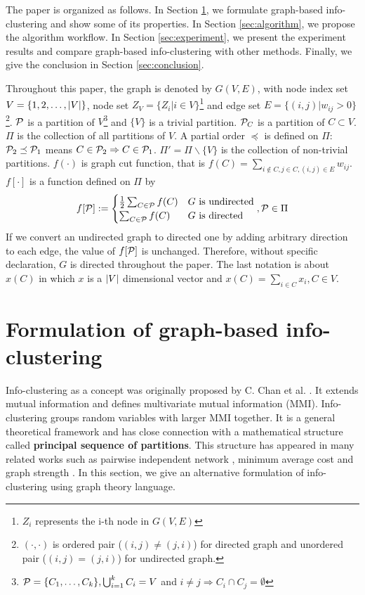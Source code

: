 \documentclass{article}
\begin{document}
The paper is organized as follows. In Section \ref{sec:models}, we formulate graph-based info-clustering and show some of its properties. In Section \ref{sec:algorithm}, we propose the algorithm workflow. In Section \ref{sec:experiment}, we present the experiment results and compare graph-based info-clustering with other methods. Finally, we give the conclusion in Section \ref{sec:conclusion}.

Throughout this paper, the graph is denoted by $G(V,E)$, with node index set $V = \{1, 2, \dots, \abs{V}\}$, node set $Z_V=\{Z_i | i \in V\}$\footnote{$Z_i$ represents the i-th node in $G(V,E)$} 
 and edge set $E=\{(i,j) | w_{ij}>0\}$\footnote{$(\cdot, \cdot)$ is ordered pair ($(i,j) \neq (j,i)$) for directed graph and unordered pair ($(i,j) = (j,i)$) for undirected graph.}. $\P$ is a partition of $V$\footnote{$\P=\{C_1, \dots, C_k\}, \bigcup_{i=1}^k C_i = V$ and $i\neq j \Rightarrow C_i \cap C_j = \emptyset$} and $\{V\}$ is a trivial partition. $\P_C$ is a partition of $C\subset V$. $\Pi$ is the collection of all partitions of $V$. A partial order $\preceq $ is defined on $\Pi$: $\P_2 \preceq \P_1$ means $C\in \P_2 \Rightarrow C \in \P_1$. $\Pi' = \Pi \backslash \{V\}$ is the collection of non-trivial partitions. $f(\cdot)$ is graph cut function, that is $f(C) = \sum_{i\not\in C, j\in C, (i,j) \in E} w_{ij}$. $f[\cdot]$ is a function defined on $\Pi$ by
\begin{equation}
f[\P] :=
\begin{cases}
\frac{1}{2} \sum_{C\in \P}f(C)   & G \textrm{ is undirected} \\
\sum_{C\in \P}f(C)   & G \textrm{ is directed}
\end{cases},\P \in \Pi
\end{equation}
If we convert an undirected graph to directed one by adding arbitrary direction to each edge, the value of $f[\P]$ is unchanged. Therefore, without specific declaration, $G$ is directed throughout the paper. The last notation is about $x(C)$ in which $x$ is a $\abs{V}$ dimensional vector and $x(C)=\sum_{i \in C} x_i, C\in V$.

\section{Formulation of graph-based info-clustering}\label{sec:models}
Info-clustering as a concept was originally proposed by C. Chan et al. \cite{RN1}.
It extends mutual information and defines multivariate mutual information (\textsf{MMI}). Info-clustering groups random variables with larger \textsf{MMI} together.   
It is a general theoretical framework and has close connection with a mathematical structure called \textbf{principal sequence of partitions}. This structure has appeared in many related works such as pairwise independent network \cite{RN9}, minimum average cost \cite{RN7} and graph strength \cite{RN12}. In this section, we give an alternative formulation of info-clustering using graph theory language.
\end{document}
